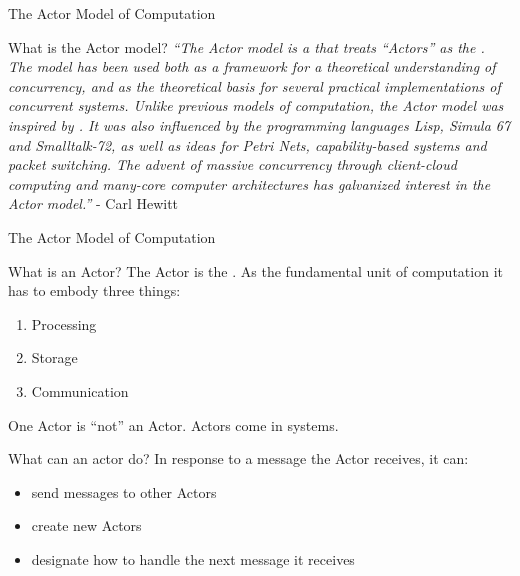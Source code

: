 \begin{frame}{The Actor Model of Computation}
\begin{block}{What is the Actor model?}
\emph{``The Actor model is a  that treats
``Actors'' as the . The model has been used both as a framework for a theoretical
understanding of concurrency, and as the theoretical basis for several practical
implementations of concurrent systems. Unlike previous models of computation,
the Actor model was inspired by . It was also
influenced by the programming languages Lisp, Simula 67 and Smalltalk-72, as
well as ideas for Petri Nets, capability-based systems and packet switching. The
advent of massive concurrency through client-cloud computing and many-core
computer architectures has galvanized interest in the Actor model.''} - Carl Hewitt
\end{block}
\end{frame}

\begin{frame}{The Actor Model of Computation}
\begin{block}{What is an Actor?}
The Actor is the . As the fundamental
unit of computation it has to embody three things:
\begin{enumerate}
  \item Processing
  \item Storage
  \item Communication
\end{enumerate}
\end{block}
\pause
\begin{center}
One Actor is ``not'' an Actor. Actors come in systems.
\end{center}
\begin{block}{What can an actor do?}
In response to a message the Actor receives, it can:
\begin{itemize}
  \item send messages to other Actors
  \item create new Actors
  \item designate how to handle the next message it receives
\end{itemize}
\end{block}
\end{frame}

